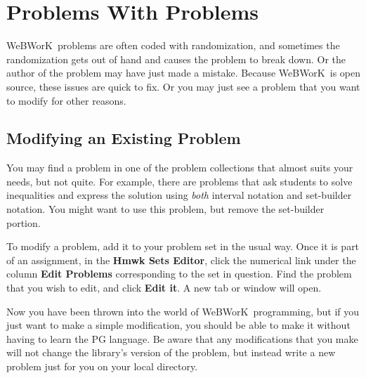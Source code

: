 \documentclass[12pt]{article}
\newcommand{\menu}[1]{\textbf{#1}}
\newcommand{\WW}{WeBWorK}
\newcommand{\HSE}{\menu{Hmwk Sets Editor}}
\begin{document}
\section{Problems With Problems}
\WW\ problems are often coded with randomization, and sometimes the randomization gets out of hand and causes the problem to break down. Or the author of the problem may have just made a mistake. Because \WW\ is open source, these issues are quick to fix. Or you may just see a problem that you want to modify for other reasons.

\subsection{Modifying an Existing Problem}

You may find a problem in one of the problem collections that almost suits your needs, but not quite.  For example, there are problems that ask students to solve inequalities and express the solution using \emph{both} interval notation and set-builder notation.  You might want to use this problem, but remove the set-builder portion.

To modify a problem, add it to your problem set in the usual way.  Once it is part of an assignment, in the \HSE, click the numerical link under the column \menu{Edit Problems} corresponding to the set in question.  Find the problem that you wish to edit, and click \menu{Edit it}.  A new tab or window will open.

Now you have been thrown into the world of \WW\ programming, but if you just want to make a simple modification, you should be able to make it without having to learn the PG language.  Be aware that any modifications that you make will not change the library's version of the problem, but instead write a new problem just for you on your local directory.
\end{document}
